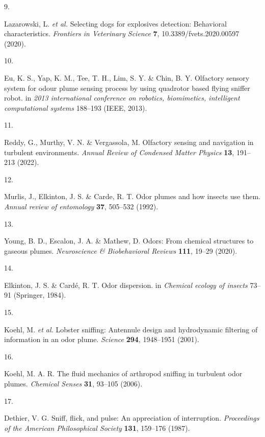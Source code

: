 \documentclass[
]{article}
\newlength{\cslhangindent}
\newlength{\csllabelwidth}
\newlength{\cslentryspacingunit} %
\newenvironment{CSLReferences}[2] %
 {%
  \setlength{\parindent}{0pt}
  \ifodd #1
  \let\oldpar\par
  \def\par{\hangindent=\cslhangindent\oldpar}
  \fi
  \setlength{\parskip}{#2\cslentryspacingunit}
 }%
 {}
\newcommand{\CSLLeftMargin}[1]{\parbox[t]{\csllabelwidth}{#1}}
\newcommand{\CSLRightInline}[1]{\parbox[t]{\linewidth - \csllabelwidth}{#1}\break}
\begin{document}
\begin{CSLReferences}{0}{0}
\leavevmode{}%
\CSLLeftMargin{9. }%
\CSLRightInline{Lazarowski, L. \emph{et al.} Selecting dogs for explosives detection: Behavioral characteristics. \emph{Frontiers in Veterinary Science} \textbf{7}, 10.3389/fvets.2020.00597 (2020).}

\leavevmode{}%
\CSLLeftMargin{10. }%
\CSLRightInline{Eu, K. S., Yap, K. M., Tee, T. H., Lim, S. Y. \& Chin, B. Y. Olfactory sensory system for odour plume sensing process by using quadrotor based flying sniffer robot. in \emph{2013 international conference on robotics, biomimetics, intelligent computational systems} 188--193 (IEEE, 2013).}

\leavevmode{}%
\CSLLeftMargin{11. }%
\CSLRightInline{Reddy, G., Murthy, V. N. \& Vergassola, M. Olfactory sensing and navigation in turbulent environments. \emph{Annual Review of Condensed Matter Physics} \textbf{13}, 191--213 (2022).}

\leavevmode{}%
\CSLLeftMargin{12. }%
\CSLRightInline{Murlis, J., Elkinton, J. S. \& Carde, R. T. Odor plumes and how insects use them. \emph{Annual review of entomology} \textbf{37}, 505--532 (1992).}

\leavevmode{}%
\CSLLeftMargin{13. }%
\CSLRightInline{Young, B. D., Escalon, J. A. \& Mathew, D. Odors: From chemical structures to gaseous plumes. \emph{Neuroscience \& Biobehavioral Reviews} \textbf{111}, 19--29 (2020).}

\leavevmode{}%
\CSLLeftMargin{14. }%
\CSLRightInline{Elkinton, J. S. \& Cardé, R. T. Odor dispersion. in \emph{Chemical ecology of insects} 73--91 (Springer, 1984).}

\leavevmode{}%
\CSLLeftMargin{15. }%
\CSLRightInline{Koehl, M. \emph{et al.} Lobster sniffing: Antennule design and hydrodynamic filtering of information in an odor plume. \emph{Science} \textbf{294}, 1948--1951 (2001).}

\leavevmode{}%
\CSLLeftMargin{16. }%
\CSLRightInline{Koehl, M. A. R. The fluid mechanics of arthropod sniffing in turbulent odor plumes. \emph{Chemical Senses} \textbf{31}, 93--105 (2006).}

\leavevmode{}%
\CSLLeftMargin{17. }%
\CSLRightInline{Dethier, V. G. Sniff, flick, and pulse: An appreciation of interruption. \emph{Proceedings of the American Philosophical Society} \textbf{131}, 159--176 (1987).}


\end{CSLReferences}
\end{document}
